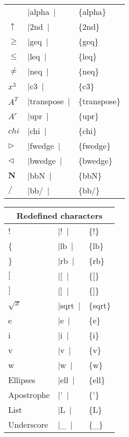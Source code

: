 \documentclass[a4paper,12pt]{article}
\newcommand{\LCDsymb}[1]{\large \textLCD{1}|{#1}~|}
\begin{document}
\begin{center}
\begin{tabular}{|l|l|>{\ttfamily}l|}
		                 & \LCDsymb{alpha}     & \{alpha\} \\
		$\uparrow$       & \LCDsymb{2nd}       & \{2nd\} \\
		$\geq$           & \LCDsymb{geq}       & \{geq\} \\
		$\leq$           & \LCDsymb{leq}       & \{leq\} \\
		$\neq$           & \LCDsymb{neq}       & \{neq\} \\
		$x^3$            & \LCDsymb{c3}        & \{c3\} \\
		$A^T$            & \LCDsymb{transpose} & \{transpose\} \\
		$A^r$            & \LCDsymb{upr}       & \{upr\} \\
		$chi$            & \LCDsymb{chi}       & \{chi\} \\
		$\triangleright$ & \LCDsymb{fwedge}    & \{fwedge\} \\
		$\triangleleft$  & \LCDsymb{bwedge}    & \{bwedge\} \\
		$\mathbf{N}$     & \LCDsymb{bbN}       & \{bbN\} \\
		$\mathbf{/}$     & \LCDsymb{bb/}       & \{bb/\} \\
		\hline
	\end{tabular}
	\newpage
	\begin{tabular}{|l|l|>{\ttfamily}l|}
		\multicolumn{3}{c}{\textbf{Redefined characters}} \\
		\hline
		!          & \LCDsymb{!}     & \{!\} \\
		\{         & \LCDsymb{lb}    & \{lb\} \\
		\}         & \LCDsymb{rb}    & \{rb\} \\
		$[$        & \LCDsymb{[}     & \{[\} \\
		$]$        & \LCDsymb{]}     & \{]\} \\
		$\sqrt{x}$ & \LCDsymb{sqrt}  & \{sqrt\} \\
		e          & \LCDsymb{e}     & \{e\} \\
		i          & \LCDsymb{i}     & \{i\} \\
		v          & \LCDsymb{v}     & \{v\} \\
		w          & \LCDsymb{w}     & \{w\} \\
		Ellipses   & \LCDsymb{ell}   & \{ell\} \\
		Apostrophe & \LCDsymb{'}     & \{'\} \\
		List       & \LCDsymb{L}     & \{L\} \\
		Underscore & \LCDsymb{_}     & \{\_\} \\
		\hline
	\end{tabular}
\end{center}
\end{document}

